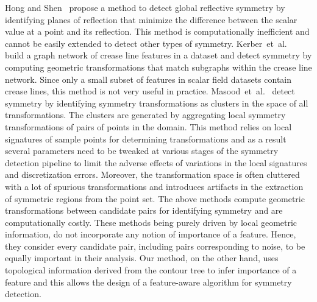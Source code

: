 \documentclass[review,journal]{vgtc}         %
\begin{document}
Hong and Shen~\cite{HongS08} propose a method to detect global reflective symmetry by identifying planes
of reflection that minimize the difference between the scalar value at a point and its
reflection. This method is computationally inefficient and cannot be easily extended to detect 
other types of symmetry. Kerber~et~al.~\cite{kerbWKS11} build a graph network of crease line features in a dataset
and detect symmetry by computing geometric transformations that match subgraphs within the crease line network.
Since only a small subset of features in scalar field datasets contain crease lines, 
this method is not very useful in practice. Masood~et~al.~\cite{MasoodTN13} detect
symmetry by identifying symmetry transformations as clusters in the space of all transformations.
The clusters are generated by aggregating local symmetry transformations of pairs of points in the 
domain. This method relies on local signatures of sample points for determining 
transformations and as a result several parameters need to be tweaked at various stages of 
the symmetry detection pipeline to limit the adverse effects of variations in the local signatures 
and discretization errors.  Moreover, the transformation space is often cluttered with a lot of 
spurious transformations and introduces artifacts in the extraction of symmetric regions from the point set. 
The above methods compute geometric transformations between candidate pairs for identifying
symmetry and are computationally costly. These methods being purely driven by local geometric 
information, do not incorporate any notion of importance of a feature. Hence, they consider every 
candidate pair, including pairs corresponding to noise, to be equally important in their analysis. 
Our method, on the other hand, uses topological information derived from the contour tree to infer 
importance of a feature and this allows the design of a feature-aware algorithm for symmetry detection. 
\end{document}
